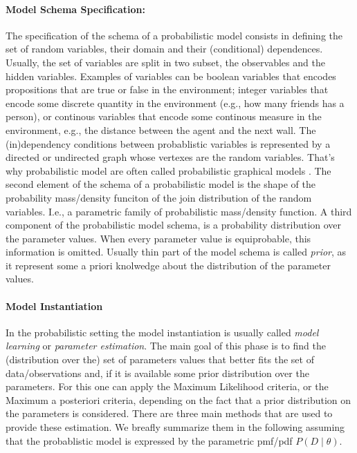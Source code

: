 \paragraph{Model Schema Specification:}
The specification of the schema of a probabilistic model consists in
defining the set of random variables, their domain and their
(conditional) dependences. Usually, the set of variables are split in
two subset, the observables and the hidden variables.  Examples of
variables can be boolean variables that encodes propositions that are
true or false in the environment; integer variables that encode some
discrete quantity in the environment (e.g., how many friends has a
person), or continous variables that encode some continous measure in
the environment, e.g., the distance between the agent and the next
wall. The (in)dependency conditions between probablistic variables is
represented by a directed or undirected graph whose vertexes are the
random variables. That's why probabilistic model are often called
probabilistic graphical models \cite{koller2009probabilistic}.  The
second element of the schema of a probabilistic model is the shape of
the probability mass/density funciton of the join distribution of the
random variables. I.e., a parametric family of probabilistic
mass/density function.  A third component of the probabilistic model
schema, is a probability distribution over the parameter values. When
every parameter value is equiprobable, this information is
omitted. Usually thin part of the model schema is called \emph{prior},
as it represent some a priori knolwedge about the distribution of the
parameter values.

\paragraph{Model Instantiation}
In the probabilistic setting the model instantiation is usually called
\emph{model learning} or \emph{parameter estimation}. The main goal of
this phase is to find the (distribution over the) set of parameters
values that better fits the set of data/observations and, if it is
available some prior distribution over the parameters. For this one
can apply the Maximum Likelihood criteria, or the Maximum a posteriori
criteria, depending on the fact that a prior distribution on the
parameters is considered. There are three main methods that are used
to provide these estimation. We breafly summarize them in the
following assuming that the probablistic model is expressed by the
parametric pmf/pdf $P(D\mid\theta)$.

